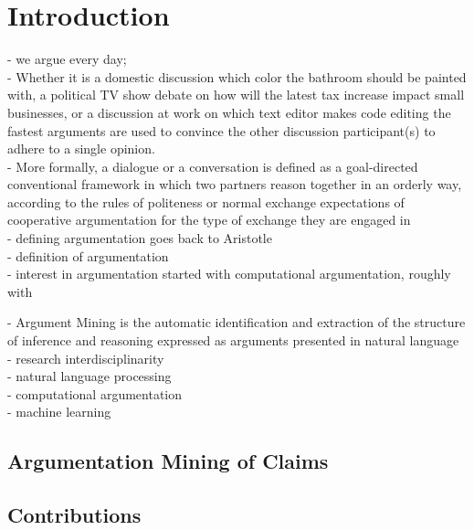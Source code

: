 \chapter{Introduction}

- we argue every day; \\
- Whether it is a domestic discussion which color the bathroom should 
be painted with, a political TV show debate on how will the latest tax increase 
impact small businesses, or a discussion at work on which text editor makes
code editing the fastest arguments are used to convince the other discussion 
participant(s) to adhere to a single opinion. \\
- More formally, a dialogue or a conversation is defined as a goal-directed
conventional framework in which two partners reason 
together in an orderly way, 
according to the rules of politeness or normal exchange expectations
of cooperative argumentation for the type of exchange they are
engaged in \citep{walton1998new} \\
- defining argumentation goes back to Aristotle \\

- definition of argumentation \\
- interest in argumentation started with computational argumentation, 
roughly with \citep{dung1995acceptability}

- Argument Mining is the automatic identification and extraction of the structure
of inference and reasoning expressed as arguments presented in natural language
\citep{lawrence2019argument} \\

- research interdisciplinarity \\
- natural language processing \\
- computational argumentation \\
- machine learning \\

\section{Argumentation Mining of Claims}

\section{Contributions}

